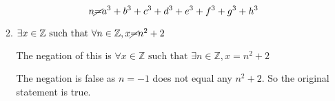 \documentclass{article}
\begin{document}
\begin{enumerate}
\begin{enumerate}
				$$n \cancel{ = }  a^3 + b^3 + c^3 + d^3 + e^3 + f^3 + g^3 + h^3$$
				
			\item $\exists x \in \mathbb{Z} \text{ such that } \forall n \in \mathbb{Z}, x \cancel{ = } n^2 +2$
			
				The negation of this is $\forall x \in \mathbb{Z} \text{ such that } \exists n \in \mathbb{Z}, x = n^2 + 2$
				
				The negation is false as $n = -1$ does not equal any $n^2 + 2$. So the original statement is true.
			
				
		\end{enumerate}
	
	\end{enumerate}
	

	
\end{document}
